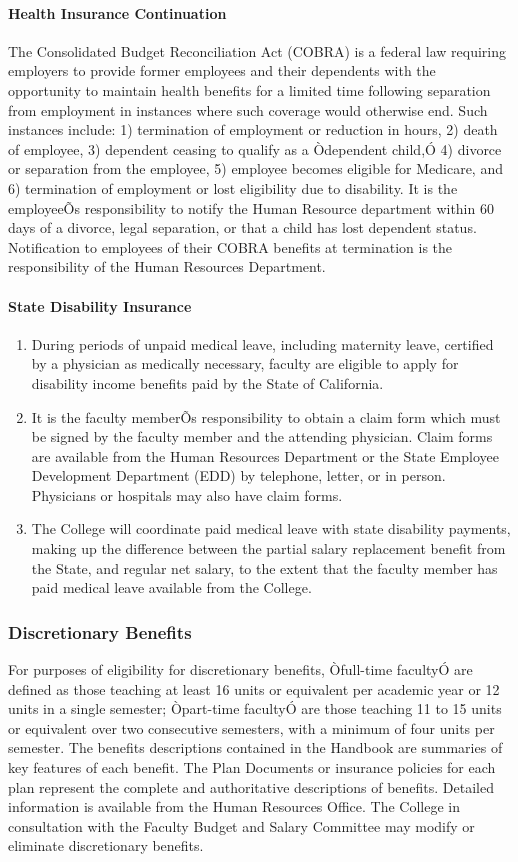 \documentclass[letterpaper, 11pt]{article}
\begin{document}
			\paragraph{Health Insurance Continuation}
				The Consolidated Budget Reconciliation Act (COBRA) is a federal law requiring employers to provide former employees and their dependents with the opportunity to maintain health benefits for a limited time following separation from employment in instances where such coverage would otherwise end.  Such instances include:  1) termination of employment or reduction in hours, 2) death of employee, 3) dependent ceasing to qualify as a Òdependent child,Ó 4) divorce or separation from the employee, 5) employee becomes eligible for Medicare, and 6) termination of employment or lost eligibility due to disability.  It is the employeeÕs responsibility to notify the Human Resource department within 60 days of a divorce, legal separation, or that a child has lost dependent status.  Notification to employees of their COBRA benefits at termination is the responsibility of the Human Resources Department.
			\paragraph{State Disability Insurance}
				\begin{enumerate}[label=\alph*)]
					\item{During periods of unpaid medical leave, including maternity leave, certified by a physician as medically necessary, faculty are eligible to apply for disability income benefits paid by the State of California.}
					\item{It is the faculty memberÕs responsibility to obtain a claim form which must be signed by the faculty member and the attending physician.  Claim forms are available from the Human Resources Department or the State Employee Development Department (EDD) by telephone, letter, or in person.  Physicians or hospitals may also have claim forms.}
					\item{The College will coordinate paid medical leave with state disability payments, making up the difference between the partial salary replacement benefit from the State, and regular net salary, to the extent that the faculty member has paid medical leave available from the College.}
				\end{enumerate}
		\subsubsection{Discretionary Benefits}
			For purposes of eligibility for discretionary benefits, Òfull-time facultyÓ are defined as those teaching at least 16 units or equivalent per academic year or 12 units in a single semester; Òpart-time facultyÓ are those teaching 11 to 15 units or equivalent over two consecutive semesters, with a minimum of four units per semester.  The benefits descriptions contained in the Handbook are summaries of key features of each benefit.  The Plan Documents or insurance policies for each plan represent the complete and authoritative descriptions of benefits.  Detailed information is available from the Human Resources Office.  The College in consultation with the Faculty Budget and Salary Committee may modify or eliminate discretionary benefits.
\end{document}
